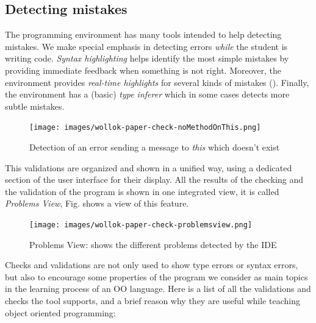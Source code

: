 \subsection{Detecting mistakes}
The programming environment has many tools intended to help detecting mistakes.
We make special emphasis in detecting errors \emph{while} the student is writing code. 
\emph{Syntax highlighting} helps identify the most simple mistakes by providing immediate feedback when something is not right. 
Moreover, the environment provides \emph{real-time highlights} for several kinds of mistakes (\cf {}).
Finally, the environment has a (basic) \emph{type inferer} which in some cases detects more subtle mistakes.

\begin{figure}[ht]
    \centering
	\texttt{[image: images/wollok-paper-check-noMethodOnThis.png]}
    \caption{Detection of an error sending a message to \emph{this} which doesn't exist}
    \label{fig:check-noMethodOnThis.png}
\end{figure}


This validations are organized and shown in a unified way, using a dedicated section of the user interface for their display.
All the results of the checking and the validation of the program is shown in one integrated view, it is called \emph{Problems View}, Fig.  shows a view of this feature. 

\begin{figure}[ht]
    \centering
	\texttt{[image: images/wollok-paper-check-problemsview.png]}
    \caption{Problems View: shows the different problems detected by the IDE }
    \label{fig:problemsview.png}
\end{figure}

Checks and validations are not only used to show type errors or syntax errors, 
but also to encourage some properties of the program we consider as main topics in the learning process of an OO language.
Here is a list of all the validations and checks the tool supports, and a brief reason why they are useful while teaching object oriented programming:

